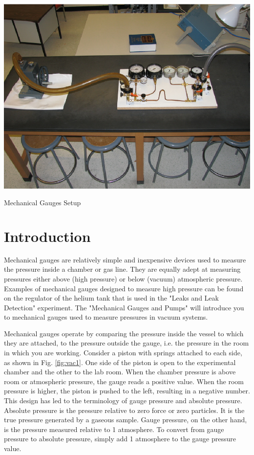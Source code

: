 \begin{marginfigure}
\includegraphics{Mechanical-Gauges-and-Pumps-Table8.eps}
\caption{Mechanical Gauges Setup}
\label{fig:VACsetup1}
\end{marginfigure}

\section{Introduction}

Mechanical gauges are relatively simple and inexpensive devices used to measure the pressure inside a chamber or gas line. They are equally adept at measuring pressures either above (high pressure) or below (vacuum) atmospheric pressure. Examples of mechanical gauges designed to measure high pressure can be found on the regulator of the helium tank that is used in the "Leaks and Leak Detection" experiment. The "Mechanical Gauges and Pumps" will introduce you to mechanical gauges used to measure pressures in vacuum systems.

Mechanical gauges operate by comparing the pressure inside the vessel to which they are attached, to the pressure outside the gauge, i.e. the pressure in the room in which you are working. Consider a piston with springs attached to each side, as shown in Fig. \ref{fig:vac1}. One side of the piston is open to the experimental chamber and the other to the lab room. When the chamber pressure is above room or atmospheric pressure, the gauge reads a positive value. When the room pressure is higher, the piston is pushed to the left, resulting in a negative number. This design has led to the terminology of gauge pressure and absolute pressure. Absolute pressure is the pressure relative to zero force or zero particles. It is the true pressure generated by a gaseous sample. Gauge pressure, on the other hand, is the pressure measured relative to 1 atmosphere. To convert from gauge pressure to absolute pressure, simply add 1 atmosphere to the gauge pressure value.

